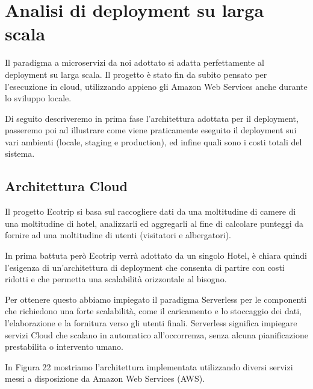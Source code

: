 
\section{Analisi di deployment su larga scala}
Il paradigma a microservizi da noi adottato si adatta perfettamente al deployment su larga scala.
Il progetto è stato fin da subito pensato per l'esecuzione in cloud, utilizzando appieno gli Amazon Web Services anche durante lo sviluppo locale.

Di seguito descriveremo in prima fase l'architettura adottata per il deployment, 
passeremo poi ad illustrare come viene praticamente eseguito il deployment sui vari ambienti (locale, staging e production), 
ed infine quali sono i costi totali del sistema. 

\subsection{Architettura Cloud}

Il progetto Ecotrip si basa sul raccogliere dati da una moltitudine di camere di una moltitudine di hotel, 
analizzarli ed aggregarli al fine di calcolare punteggi da fornire ad una moltitudine di utenti (visitatori e albergatori).

In prima battuta però Ecotrip verrà adottato da un singolo Hotel, è chiara quindi l'esigenza di un'architettura di deployment 
che consenta di partire con costi ridotti e che permetta una scalabilità orizzontale al bisogno.

Per ottenere questo abbiamo impiegato il paradigma Serverless per le componenti che richiedono una forte scalabilità, 
come il caricamento e lo stoccaggio dei dati, l'elaborazione e la fornitura verso gli utenti finali. 
Serverless significa impiegare servizi Cloud che scalano in automatico all'occorrenza, senza alcuna pianificazione prestabilita o intervento umano.

In Figura 22 mostriamo l'architettura implementata utilizzando diversi servizi messi a disposizione da Amazon Web Services (AWS).

